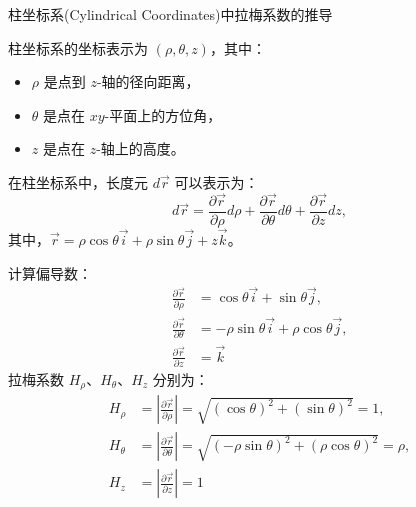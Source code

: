 \documentclass[12pt, a4paper, oneside, UTF8]{ctexbook}  %
\begin{document}
\begin{example}
    柱坐标系(Cylindrical Coordinates)中拉梅系数的推导

    柱坐标系的坐标表示为 \((\rho, \theta, z)\)，其中：
\begin{itemize}
    \item \(\rho\) 是点到 \(z\)-轴的径向距离，
    \item \(\theta\) 是点在 \(xy\)-平面上的方位角，
    \item \(z\) 是点在 \(z\)-轴上的高度。
\end{itemize}
在柱坐标系中，长度元 \(d\vec{r}\) 可以表示为：
\[
d\vec{r} = \frac{\partial \vec{r}}{\partial \rho} d\rho + \frac{\partial \vec{r}}{\partial \theta} d\theta + \frac{\partial \vec{r}}{\partial z} dz,
\]
其中，\(\vec{r} = \rho \cos \theta \vec{i} + \rho \sin \theta \vec{j} + z \vec{k}\)。

计算偏导数：
\begin{align*}
    \frac{\partial \vec{r}}{\partial \rho} &= \cos \theta \vec{i} + \sin \theta \vec{j},
    \\\frac{\partial \vec{r}}{\partial \theta} &= -\rho \sin \theta \vec{i} + \rho \cos \theta \vec{j},
    \\\frac{\partial \vec{r}}{\partial z} &= \vec{k}
\end{align*}
拉梅系数 \(H_\rho\)、\(H_\theta\)、\(H_z\) 分别为：
\begin{align*}
    H_\rho &= \left| \frac{\partial \vec{r}}{\partial \rho} \right| = \sqrt{(\cos \theta)^2 + (\sin \theta)^2} = 1,
    \\H_\theta &= \left| \frac{\partial \vec{r}}{\partial \theta} \right| = \sqrt{(-\rho \sin \theta)^2 + (\rho \cos \theta)^2} = \rho,
    \\H_z &= \left| \frac{\partial \vec{r}}{\partial z} \right| = 1
\end{align*}
\end{example}
\end{document}
